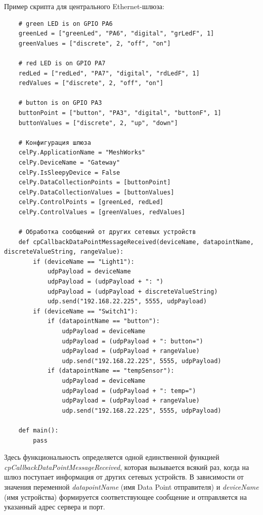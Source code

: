 \documentclass[11pt]{article}
\begin{document}
Пример скрипта для центрального Ethernet-шлюза:
\begin{verbatim}
    # green LED is on GPIO PA6
    greenLed = ["greenLed", "PA6", "digital", "grLedF", 1]
    greenValues = ["discrete", 2, "off", "on"]
    
    # red LED is on GPIO PA7
    redLed = ["redLed", "PA7", "digital", "rdLedF", 1]
    redValues = ["discrete", 2, "off", "on"]
    
    # button is on GPIO PA3
    buttonPoint = ["button", "PA3", "digital", "buttonF", 1]
    buttonValues = ["discrete", 2, "up", "down"]
    
    # Конфигурация шлюза
    celPy.ApplicationName = "MeshWorks"
    celPy.DeviceName = "Gateway"
    celPy.IsSleepyDevice = False
    celPy.DataCollectionPoints = [buttonPoint]
    celPy.DataCollectionValues = [buttonValues]
    celPy.ControlPoints = [greenLed, redLed]
    celPy.ControlValues = [greenValues, redValues]
    
    # Обработка сообщений от других сетевых устройств
    def cpCallbackDataPointMessageReceived(deviceName, datapointName, discreteValueString, rangeValue):
        if (deviceName == "Light1"):
            udpPayload = deviceName
            udpPayload = (udpPayload + ": ")
            udpPayload = (udpPayload + discreteValueString)
            udp.send("192.168.22.225", 5555, udpPayload)
        if (deviceName == "Switch1"):
            if (datapointName == "button"):
                udpPayload = deviceName
                udpPayload = (udpPayload + ": button=")
                udpPayload = (udpPayload + rangeValue)
                udp.send("192.168.22.225", 5555, udpPayload)
            if (datapointName == "tempSensor"):
                udpPayload = deviceName
                udpPayload = (udpPayload + ": temp=")
                udpPayload = (udpPayload + rangeValue)
                udp.send("192.168.22.225", 5555, udpPayload)
    
    def main():
        pass
\end{verbatim}

Здесь функциональность определяется одной единственной функцией 
\emph{cpCallbackDataPointMessageReceived}, которая вызывается всякий раз, когда 
на шлюз поступает информация от других сетевых устройств. В зависимости от значения
переменной \emph{datapointName} (имя Data Point отправителя) и \emph{deviceName} (имя 
устройства) формируется соответствующее сообщение и отправляется на указанный адрес
сервера и порт.
\end{document}
